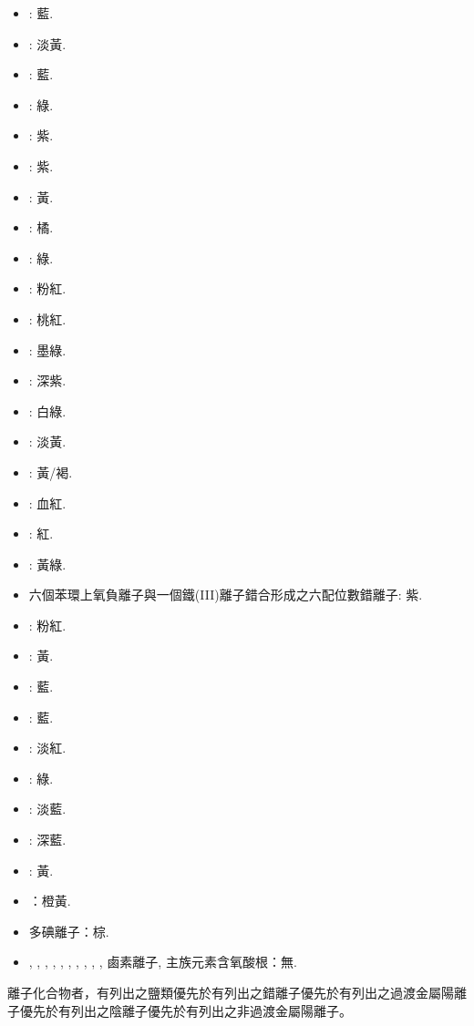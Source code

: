 \documentclass[a4paper,12pt]{report}
\begin{document}
\begin{itemize}
\item {}: 藍.
\item {}: 淡黃.
\item {}: 藍.
\item {}: 綠.
\item {}: 紫.
\item {}: 紫.
\item {}: 黃.
\item {}: 橘.
\item {}: 綠. 
\item {}: 粉紅.
\item {}: 桃紅.
\item {}: 墨綠.
\item {}: 深紫.
\item {}: 白綠.
\item {}: 淡黃.
\item {}: 黃/褐.
\item {}: 血紅.
\item {}: 紅.
\item {}: 黃綠.
\item 六個苯環上氧負離子與一個鐵(III)離子錯合形成之六配位數錯離子: 紫.
\item {}: 粉紅.
\item {}: 黃.
\item {}: 藍.
\item {}: 藍.
\item {}: 淡紅.
\item {}: 綠. 
\item {}: 淡藍.
\item {}: 深藍.
\item {}: 黃.
\item {}：橙黃.
\item 多碘離子：棕.
\item {}, , , , , , , , , , 鹵素離子, 主族元素含氧酸根：無.
\end{itemize}
離子化合物者，有列出之鹽類優先於有列出之錯離子優先於有列出之過渡金屬陽離子優先於有列出之陰離子優先於有列出之非過渡金屬陽離子。
\end{document}
